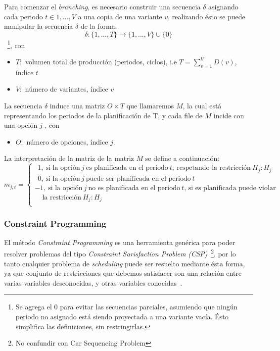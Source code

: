 Para comenzar el \emph{branching}, es necesario construir una secuencia $\delta$
asignando cada periodo $t\in {1,...,V}$ a una copia de una variante $v$, realizando ésto
se puede manipular la secuencia $\delta$ de la forma:
$$\delta : \{1,...,T\}\rightarrow\{1,...,V\}\cup\{0\}$$~\footnote{
Se agrega el $0$ para evitar las secuencias parciales, asumiendo que ningún periodo no asignado
está siendo proyectada a una variante vacía. Ésto simplifica las definiciones, sin restringirlas.
}, con
\begin{itemize}
	\item $T:$ volumen total de producción (periodos, ciclos), i.e $T=\sum\limits_{v=1}^{V}D(v)$, índice $t$
	\item $V:$ número de variantes, índice $v$
\end{itemize}

La secuencia $\delta$ induce una matriz $O\times T$ que llamaremos $M$,
la cual está representando los periodos de la planificación de T,
y cada file de $M$ incide con una opción $j$
, con
\begin{itemize}
	\item $O:$ número de opciones, índice $j$.
\end{itemize}

La interpretación de la matriz de la matriz $M$ se define a continuación:\\

$m_{j,t} = \left\{ \begin{array}{l}
\ \ 1,\ \text{si la opción}\ j\ \text{es planificada en el periodo}\ t,\ \text{respetando la restricción}\ H_{j}:H_{j}\\
\ \ 0,\ \text{si la opción}\ j\ \text{puede ser planificada en el periodo}\ t\\
-1,\ \text{si la opción}\ j\ \text{no es planificada en el periodo}\ t\text{, si es planificada puede violar}\\
\ \ \ \ \ \text{la restricción}\ H_{j}:H_{j}\\
\end{array} \right.$

\subsubsection{Constraint Programming}

El método \emph{Constraint Programming} es una herramienta genérica para poder resolver problemas
del tipo \emph{Constraint  Sarisfaction Problem (CSP)}~\footnote{No confundir con Car Sequencing Problem},
por lo tanto cualquier problema de \emph{scheduling} puede ser resuelto mediante ésta forma,
ya que conjunto de restricciones que debemos satisfacer son una relación entre varias variables desconocidas,
y otras variables conocidas~\cite{Tsa93}.

